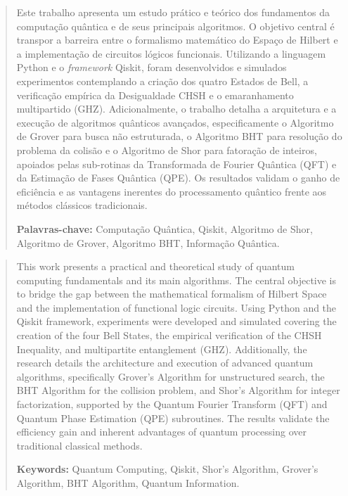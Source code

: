 \documentclass[12pt, a4paper]{article}
\begin{document}
\maketitle

\begin{abstract}
\singlespacing
Este trabalho apresenta um estudo prático e teórico dos fundamentos da computação quântica e de seus principais algoritmos. O objetivo central é transpor a barreira entre o formalismo matemático do Espaço de Hilbert e a implementação de circuitos lógicos funcionais. Utilizando a linguagem Python e o \textit{framework} Qiskit, foram desenvolvidos e simulados experimentos contemplando a criação dos quatro Estados de Bell, a verificação empírica da Desigualdade CHSH e o emaranhamento multipartido (GHZ). Adicionalmente, o trabalho detalha a arquitetura e a execução de algoritmos quânticos avançados, especificamente o Algoritmo de Grover para busca não estruturada, o Algoritmo BHT para resolução do problema da colisão e o Algoritmo de Shor para fatoração de inteiros, apoiados pelas sub-rotinas da Transformada de Fourier Quântica (QFT) e da Estimação de Fases Quântica (QPE). Os resultados validam o ganho de eficiência e as vantagens %
inerentes do processamento quântico frente aos métodos clássicos tradicionais.

\vspace{0.4cm}
\noindent\textbf{Palavras-chave:} Computação Quântica, Qiskit, Algoritmo de Shor, Algoritmo de Grover, Algoritmo BHT, Informação Quântica.
\end{abstract}

\clearpage

\vspace*{1.5cm}
\renewcommand{\abstractname}{\Large Abstract}
\begin{abstract}
\singlespacing
\normalsize
This work presents a practical and theoretical study of quantum computing fundamentals and its main algorithms. The central objective is to bridge the gap between the mathematical formalism of Hilbert Space and the implementation of functional logic circuits. Using Python and the Qiskit framework, experiments were developed and simulated covering the creation of the four Bell States, the empirical verification of the CHSH Inequality, and multipartite entanglement (GHZ). Additionally, the research details the architecture and execution of advanced quantum algorithms, specifically Grover's Algorithm for unstructured search, the BHT Algorithm for the collision problem, and Shor's Algorithm for integer factorization, supported by the Quantum Fourier Transform (QFT) and Quantum Phase Estimation (QPE) subroutines. The results validate the efficiency gain and inherent %
advantages of quantum processing over traditional classical methods.

\vspace{0.4cm}
\begin{sloppypar}
\noindent\textbf{Keywords:} Quantum Computing, Qiskit, Shor's Algorithm, Grover's Algorithm, BHT Algorithm, Quantum Information.
\end{sloppypar}
\end{abstract}
\end{document}
